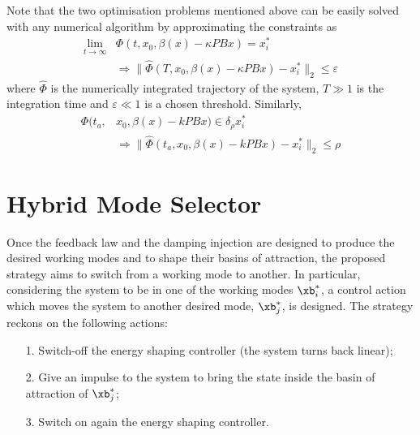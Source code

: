 {Note that the two optimisation problems mentioned above can be easily solved with any numerical algorithm by approximating the constraints as
\begin{align*}
    \lim\limits_{t\rightarrow\infty}&\Phi(t,x_0,\beta(x)-\kappa PBx)=x^*_i\\    
    &\Rightarrow \|\hat{\Phi}(T,x_0,\beta(x)-\kappa PBx)-x^*_i\|_2\leq\varepsilon
\end{align*}
%
where $\hat{\Phi}$ is the numerically integrated trajectory of the system, $T\gg 1$ is the integration time and $\varepsilon \ll 1$ is a chosen threshold.
Similarly,
\begin{align*}
    \Phi(t_a,&x_0,\beta(x)-kPBx)\in\delta_\rho x_i^*\\    
    &\Rightarrow \|\hat{\Phi}(t_a,x_0,\beta(x)-kPBx)-x^*_i\|_2\leq\rho
\end{align*}
}
\fi
%
%
\section{Hybrid Mode Selector}
%
Once the feedback law and the damping injection are designed to produce the desired working modes and to shape their basins of attraction, the proposed strategy aims to switch from a working mode to another.
In particular, considering the system to be in one of the working modes $\xb_i^*$, a control action which moves the system to another desired mode, $\xb_j^*$, is designed.
The strategy reckons on the following actions:
\begin{itemize}
    \item [1.] Switch-off the energy shaping controller (the system turns back linear);
    \item [2.] Give an impulse to the system to bring the state inside the basin of attraction of $\xb_j^*$;
    \item [3.] Switch on again the energy shaping controller.
\end{itemize}
%

